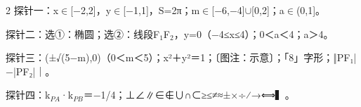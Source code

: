 \documentclass[fontset=none]{ctexart}
\begin{document}
\begin{multicols}{2}
探针一：x$\in$[−2,2]，y$\in$[−1,1]，S=2π；m$\in$[−6,−4]$\cup$[0,2]；a$\in$(0,1]。

探针二：选①：椭圆；选②：线段F$_1$F$_2$，y=0（−4≤x≤4）；0＜a＜4；a＞4。

探针三：(±√(5−m),0)（0＜m＜5）；x²＋y²＝1；〔图注：示意〕；「8」字形；‖PF₁|−|PF₂|｜。

探针四：k$_{PA}$·k$_{PB}$＝−1/4；⊥∠∥∈∉∪∩⊂≥≤≠≈±×÷⁄→⟺▍。
\end{multicols}
\end{document}
